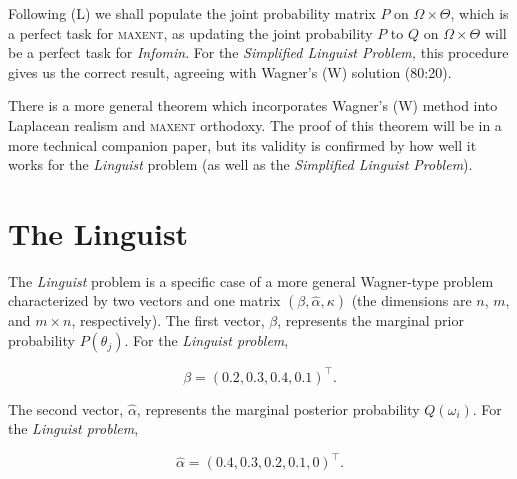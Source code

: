 \documentclass[12pt]{article}
\begin{document}
Following (L) we shall populate the joint probability matrix $P$ on
$\Omega\times\Theta$, which is a perfect task for \textsc{maxent}, as
updating the joint probability $P$ to $Q$ on $\Omega\times\Theta$ will
be a perfect task for \emph{Infomin}. For the \emph{Simplified
  Linguist Problem,} this procedure gives us the correct result,
agreeing with Wagner's (W) solution (80:20). 

There is a more general theorem which incorporates Wagner's (W) method
into Laplacean realism and \textsc{maxent} orthodoxy. The proof of
this theorem will be in a more technical companion paper, but its
validity is confirmed by how well it works for the \emph{Linguist}
problem (as well as the \emph{Simplified Linguist Problem}).

\section{The Linguist}
\label{TheLinguist}

The \emph{Linguist} problem is a specific case of a more general
Wagner-type problem characterized by two vectors and one matrix
$(\beta,\hat{\alpha},\kappa)$ (the dimensions are $n$, $m$, and
$m\times{}n$, respectively). The first vector, $\beta$, represents
the marginal prior probability $P(\theta_{j})$. For the \emph{Linguist
problem},

\begin{equation}
  \label{eq:p1}
  \beta=(0.2,0.3,0.4,0.1)^{\intercal}.
\end{equation}

The second vector, $\hat{\alpha}$, represents the marginal posterior
probability $Q(\omega_{i})$. For the \emph{Linguist problem},

\begin{equation}
  \label{eq:p2}
  \hat{\alpha}=(0.4,0.3,0.2,0.1,0)^{\intercal}.
\end{equation}
\end{document}
